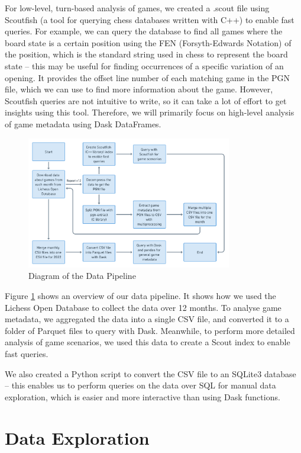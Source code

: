 \documentclass[a4paper, 11pt]{article}
\begin{document}
For low-level, turn-based analysis of games, we created a .scout file using Scoutfish (a tool for querying chess databases written with C++) \cite{scoutfish} to enable fast queries. For example, we can query the database to find all games where the board state is a certain position using the FEN (Forsyth-Edwards Notation) of the position, which is the standard string used in chess to represent the board state -- this may be useful for finding occurrences of a specific variation of an opening. It provides the offset line number of each matching game in the PGN file, which we can use to find more information about the game. However, Scoutfish queries are not intuitive to write, so it can take a lot of effort to get insights using this tool. Therefore, we will primarily focus on high-level analysis of game metadata using Dask DataFrames.

\begin{figure}[H]
    \centering
    \caption{Diagram of the Data Pipeline}
    \label{fig:dataPipeline}
    \includegraphics[width=0.8\textwidth]{Data Pipeline.png}
\end{figure}

Figure \ref{fig:dataPipeline} shows an overview of our data pipeline. It shows how we used the Lichess Open Database to collect the data over 12 months. To analyse game metadata, we aggregated the data into a single CSV file, and converted it to a folder of Parquet files to query with Dask. Meanwhile, to perform more detailed analysis of game scenarios, we used this data to create a Scout index to enable fast queries.

We also created a Python script to convert the CSV file to an SQLite3 database -- this enables us to perform queries on the data over SQL for manual data exploration, which is easier and more interactive than using Dask functions.

\section{Data Exploration}
\end{document}
